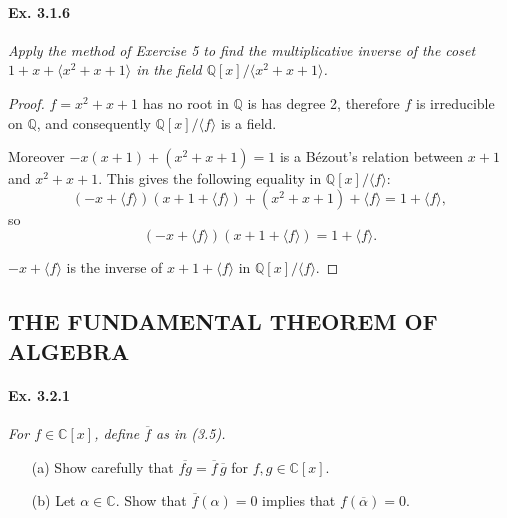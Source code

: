 \documentclass[11pt,a4paper]{article}
\newcommand{\Q}{\mathbb{Q}}
\newcommand{\C}{\mathbb{C}}
\begin{document}
\paragraph{Ex. 3.1.6}

{\it Apply the method of Exercise 5 to find the multiplicative inverse of the coset $1+x+\langle x^2+x+1\rangle$ in the field $\Q[x]/\langle x^2+x+1 \rangle$.
}

\begin{proof}

$f = x^2+x+1$ has no root in $\mathbb{Q}$ is has degree 2, therefore $f$ is irreducible on $\mathbb{Q}$, and consequently $\Q[x]/\langle f \rangle$ is a field.

 Moreover $-x(x+1) + (x^2+x+1) = 1$ is a B\'ezout's relation between $x+1$ and $x^2+x+1$. This gives the following equality in $\Q[x]/\langle f \rangle$:
$$(-x + \langle f \rangle) (x+1+\langle f \rangle) +  (x^2+x+1) + \langle f \rangle = 1 + \langle f \rangle,$$
so
$$(-x + \langle f \rangle) (x+1+\langle f \rangle)  = 1 + \langle f \rangle.$$

$-x + \langle f \rangle$ is the inverse of $x+1+\langle f \rangle$ in $\Q[x]/\langle f \rangle$.
\end{proof}

\subsection{THE FUNDAMENTAL THEOREM OF ALGEBRA}
\paragraph{Ex. 3.2.1}

{\it For $f \in \C[x]$, define $\overline{f}$ as in (3.5).
\begin{enumerate}
\item[(a)] Show carefully that $\overline{fg} = \overline{f}\, \overline{g}$ for $f,g \in \C[x]$.
\item[(b)] Let $\alpha \in \C$. Show that $\overline{f}(\alpha) = 0$ implies that $f(\overline{\alpha} )= 0$.
\end{enumerate}
}
\end{document}
